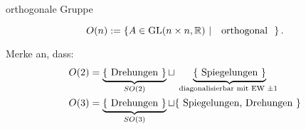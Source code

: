 \documentclass[class=article, crop=false]{standalone}
\begin{document}
\begin{zettel}{orthogonale Gruppe}
\begin{flashcard}
	\begin{definition}
		\[
			O (n):= \set{A \in  \GL(n \times n,\R )}{\tx{ orthogonal }}
		.\]
	\end{definition}
\end{flashcard}

Merke an, dass:
\begin{align*}
	O(2) & = \underbrace{\set{\tx{Drehungen}}}_{SO(2)} \sqcup \underbrace{\set{\tx{Spiegelungen}}}_\tx{diagonalisierbar mit EW $\pm 1$ } \\
	O(3) & = \underbrace{\set{\tx{Drehungen}}}_{SO(3)} \sqcup \set{\tx{Spiegelungen, Drehungen} }                                        \\
\end{align*}
\end{zettel}
\end{document}
